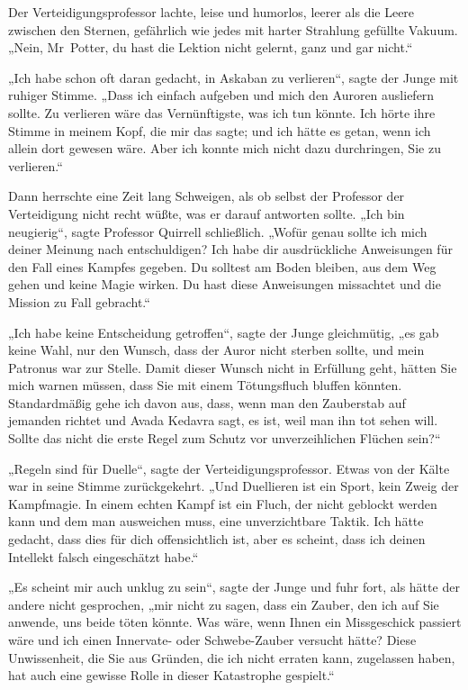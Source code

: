 {Der Verteidigungsprofessor lachte, leise und humorlos, leerer als die Leere zwischen den Sternen, gefährlich wie jedes mit harter Strahlung gefüllte Vakuum. „Nein, Mr~Potter, du hast die Lektion nicht gelernt, ganz und gar nicht.“

„Ich habe schon oft daran gedacht, in Askaban zu verlieren“, sagte der Junge mit ruhiger Stimme. „Dass ich einfach aufgeben und mich den Auroren ausliefern sollte. Zu verlieren wäre das Vernünftigste, was ich tun könnte. Ich hörte ihre Stimme in meinem Kopf, die mir das sagte; und ich hätte es getan, wenn ich allein dort gewesen wäre. Aber ich konnte mich nicht dazu durchringen, Sie zu verlieren.“

Dann herrschte eine Zeit lang Schweigen, als ob selbst der Professor der Verteidigung nicht recht wüßte, was er darauf antworten sollte. „Ich bin neugierig“, sagte Professor Quirrell schließlich. „Wofür genau sollte ich mich deiner Meinung nach entschuldigen? Ich habe dir ausdrückliche Anweisungen für den Fall eines Kampfes gegeben. Du solltest am Boden bleiben, aus dem Weg gehen und keine Magie wirken. Du hast diese Anweisungen missachtet und die Mission zu Fall gebracht.“

„Ich habe keine Entscheidung getroffen“, sagte der Junge gleichmütig, „es gab keine Wahl, nur den Wunsch, dass der Auror nicht sterben sollte, und mein Patronus war zur Stelle. Damit dieser Wunsch nicht in Erfüllung geht, hätten Sie mich warnen müssen, dass Sie mit einem Tötungsfluch bluffen könnten. Standardmäßig gehe ich davon aus, dass, wenn man den Zauberstab auf jemanden richtet und Avada Kedavra sagt, es ist, weil man ihn tot sehen will. Sollte das nicht die erste Regel zum Schutz vor unverzeihlichen Flüchen sein?“

„Regeln sind für Duelle“, sagte der Verteidigungsprofessor. Etwas von der Kälte war in seine Stimme zurückgekehrt. „Und Duellieren ist ein Sport, kein Zweig der Kampfmagie. In einem echten Kampf ist ein Fluch, der nicht geblockt werden kann und dem man ausweichen muss, eine unverzichtbare Taktik. Ich hätte gedacht, dass dies für dich offensichtlich ist, aber es scheint, dass ich deinen Intellekt falsch eingeschätzt habe.“

„Es scheint mir auch unklug zu sein“, sagte der Junge und fuhr fort, als hätte der andere nicht gesprochen, „mir nicht zu sagen, dass ein Zauber, den ich auf Sie anwende, uns beide töten könnte. Was wäre, wenn Ihnen ein Missgeschick passiert wäre und ich einen Innervate- oder Schwebe-Zauber versucht hätte? Diese Unwissenheit, die Sie aus Gründen, die ich nicht erraten kann, zugelassen haben, hat auch eine gewisse Rolle in dieser Katastrophe gespielt.“

}
